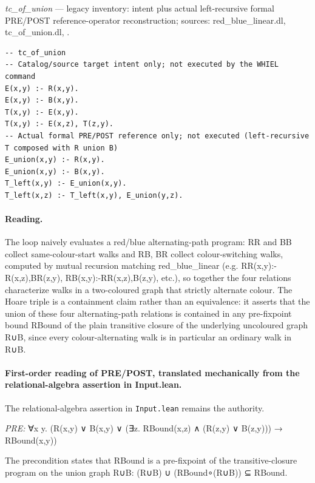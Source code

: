 \documentclass[10pt]{article}
\begin{document}
{\raggedright\textit{tc\_of\_union} --- legacy inventory:  intent plus actual left-recursive formal PRE/POST reference-operator reconstruction; sources: red\_blue\_linear.dl, tc\_of\_union.dl, .\par}

\begin{Verbatim}[fontsize=\scriptsize,breaklines=true,breakanywhere=true,frame=single,framesep=1.5mm]
-- tc_of_union
-- Catalog/source target intent only; not executed by the WHIEL command
E(x,y) :- R(x,y).
E(x,y) :- B(x,y).
T(x,y) :- E(x,y).
T(x,y) :- E(x,z), T(z,y).
-- Actual formal PRE/POST reference only; not executed (left-recursive T composed with R union B)
E_union(x,y) :- R(x,y).
E_union(x,y) :- B(x,y).
T_left(x,y) :- E_union(x,y).
T_left(x,z) :- T_left(x,y), E_union(y,z).
\end{Verbatim}

\paragraph{Reading.} The loop naively evaluates a red/blue alternating-path program: RR and BB collect same-colour-start walks and RB, BR collect colour-switching walks, computed by mutual recursion matching red\_blue\_linear (e.g. RR(x,y):-R(x,z),BR(z,y), RB(x,y):-RR(x,z),B(z,y), etc.), so together the four relations characterize walks in a two-coloured graph that strictly alternate colour. The Hoare triple is a containment claim rather than an equivalence: it asserts that the union of these four alternating-path relations is contained in any pre-fixpoint bound RBound of the plain transitive closure of the underlying uncoloured graph R∪B, since every colour-alternating walk is in particular an ordinary walk in R∪B.

\paragraph{First-order reading of PRE/POST, translated mechanically from the relational-algebra assertion in Input.lean.} The relational-algebra assertion in \texttt{Input.lean} remains the authority.

\textit{PRE:} ∀x y. (R(x,y) ∨ B(x,y) ∨ (∃z. RBound(x,z) ∧ (R(z,y) ∨ B(z,y))) → RBound(x,y))\par The precondition states that RBound is a pre-fixpoint of the transitive-closure program on the union graph R∪B: (R∪B) ∪ (RBound∘(R∪B)) ⊆ RBound.
\end{document}
